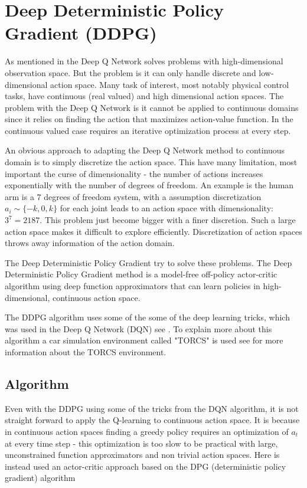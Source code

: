 \section{Deep Deterministic Policy Gradient (DDPG)}
As mentioned in  the Deep Q Network solves problems with high-dimensional observation space. But the problem is it can only handle discrete and low-dimensional action space. Many task of interest, most notably physical control tasks, have continuous (real valued) and high dimensional action spaces. The problem with the Deep Q Network is it cannot be applied to continuous domains since it relies on finding the action that maximizes action-value function. In the continuous valued case requires an iterative optimization process at every step. \cite{DBLP:journals/corr/LillicrapHPHETS15}

An obvious approach to adapting the Deep Q Network method to continuous domain is to simply discretize the action space. This have many limitation, most important the curse of dimensionality - the number of actions increases exponentially with the number of degrees of freedom. An example is the human arm is a 7 degrees of freedom system, with a assumption discretization $a_i \sim  \{-k,0,k\}$ for each joint leads to an action space with dimensionality: $3^7 = 2187$. This problem just become bigger with a finer discretion. Such a large action space makes it difficult to explore efficiently. Discretization of action spaces throws away information of the action domain.

The Deep Deterministic Policy Gradient try to solve these problems. The Deep Deterministic Policy Gradient method is a model-free off-policy actor-critic algorithm using deep function approximators that can learn policies in high-dimensional, continuous action space. 

The DDPG algorithm uses some of the some of the deep learning tricks, which was used in the Deep Q Network (DQN) see . To explain more about this algorithm a car simulation environment called "TORCS" is used see  for more information about the TORCS environment. \cite{DDPG_Torcs} 

\subsection{Algorithm}
Even with the DDPG using some of the tricks from the DQN algorithm, it is not straight forward to apply the Q-learning to continuous action space. It is because in continuous action spaces finding a greedy policy requires an optimization of \textit{$a_t$} at every time step - this optimization is too slow to be practical with large, unconstrained function approximators and non trivial action spaces. Here is instead used an actor-critic approach based on the DPG (deterministic policy gradient) algorithm \cite{DBLP:conf/icml/SilverLHDWR14}

